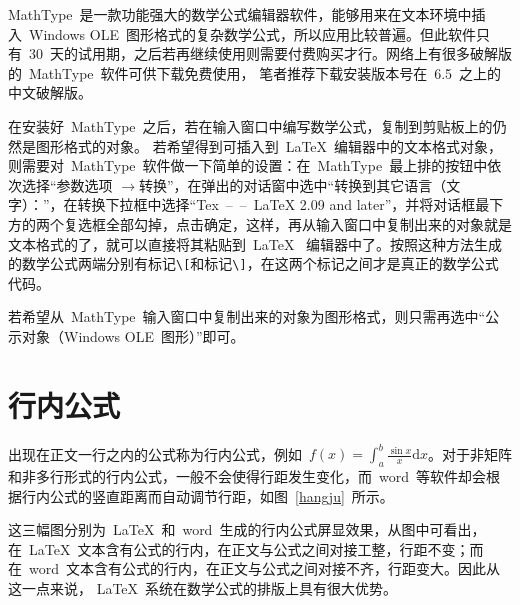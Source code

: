 MathType~是一款功能强大的数学公式编辑器软件，能够用来在文本环境中插入~Windows OLE~图形格式的复杂数学公式，所以应用比较普遍。但此软件只有~30~天的试用期，之后若再继续使用则需要付费购买才行。网络上有很多破解版的~MathType~软件可供下载免费使用，
笔者推荐下载安装版本号在~6.5~之上的中文破解版。

在安装好~MathType~之后，若在输入窗口中编写数学公式，复制到剪贴板上的仍然是图形格式的对象。
若希望得到可插入到~\LaTeX~编辑器中的文本格式对象，则需要对~MathType~软件做一下简单的设置：在~MathType~最上排的按钮中依次选择“参数选项
$\to$转换”，在弹出的对话窗中选中“转换到其它语言（文字）：”，在转换下拉框中选择“Tex~--~--~LaTeX 2.09 and later”，并将对话框最下方的两个复选框全部勾掉，点击确定，这样，再从输入窗口中复制出来的对象就是文本格式的了，就可以直接将其粘贴到~\LaTeX~
编辑器中了。按照这种方法生成的数学公式两端分别有标记\verb|\[|和标记\verb|\]|，在这两个标记之间才是真正的数学公式代码。

若希望从~MathType~输入窗口中复制出来的对象为图形格式，则只需再选中“公示对象（Windows OLE~图形）”即可。


\section{行内公式}

出现在正文一行之内的公式称为行内公式，例如~$f(x)=\int_{a}^{b}\frac{\sin{x}}{x}\mathrm{d}x$。对于非矩阵和非多行形式的行内公式，一般不会使得行距发生变化，而~word~等软件却会根据行内公式的竖直距离而自动调节行距，如图~\ref{hangju}~所示。
\begin{figure}[htbp]
  \centering
  \subfigure{\label{latex}}\addtocounter{subfigure}{-2}
  \subfigure{\label{word}}\addtocounter{subfigure}{-2}
  \subfigure{\label{pdf}}\addtocounter{subfigure}{-2}
  \vspace{-1em}
\end{figure}
这三幅图分别为~\LaTeX~和~word~生成的行内公式屏显效果，从图中可看出，在~\LaTeX~文本含有公式的行内，在正文与公式之间对接工整，行距不变；而在~word~文本含有公式的行内，在正文与公式之间对接不齐，行距变大。因此从这一点来说，
\LaTeX~系统在数学公式的排版上具有很大优势。

